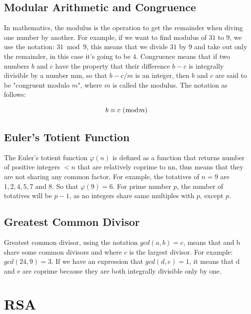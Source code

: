 \documentclass[a4paper, 12pt]{article}
\begin{document}
\subsection{Modular Arithmetic and Congruence}
\label{bsec:mod}

In mathematics, the modulus is the operation to get the remainder when diving one number by
another. For example, if we want to find modulus of $31$ to $9$, we use the notation: $31\bmod9$, this
means that we divide $31$ by $9$ and take out only the remainder, in this case it's going to be $4$.
Congruence means that if two numbers $b$ and $c$ have the property that their difference $b - c$ is
integrally divisible by a number mm, so that $b - c/m$ is an integer, then $b$ and $c$ are said to be
"congruent modulo $m$", where $m$ is called the modulus. The notation as follows:

\begin{equation*}
  b \equiv c \text{ } (\bmod m)\\
  \end{equation*}

\subsection{Euler's Totient Function}
\label{bsec:euler}

The Euler's totient function $\varphi(n)$ is defined as a function that returns number of positive integers
$<n$ that are relatively coprime to nn, thus means that they are not sharing any common factor. For
example, the totatives of $n = 9$ are $1, 2, 4, 5, 7 \text{ and } 8$. So that $\varphi(9) = 6$. For prime number $p$, the
number of totatives will be $p - 1$, as no integers share same multiples with $p$, except $p$.

\subsection{Greatest Common Divisor}
\label{bsec:gcd}

Greatest common divisor, using the notation $gcd(a,b)=c$, means that and b share some common
divisors and where $c$ is the largest divisor. For example: $gcd(24,9)=3$. If we have an
expression that $gcd(d,e)=1$, it means that d and e are coprime because they are both integrally
divisible only by one.

\section{RSA}
\label{sec:rsa}
\end{document}
